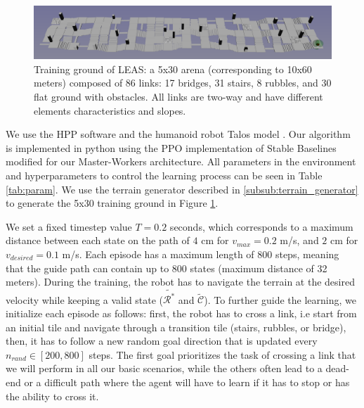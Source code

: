\begin{figure}
    \centering
    \includegraphics[width=\textwidth]{Figures/Chapter_LEAS/arena_5x30.png}
    \caption{Training ground of LEAS: a 5x30 arena (corresponding to 10x60 meters) composed of 86 links: 17 bridges, 31 stairs, 8 rubbles, and 30 flat ground with obstacles. All links are two-way and have different elements characteristics and slopes.}
    \label{fig:arena_5x30}
\end{figure}

We use the HPP software \cite{HPP} and the humanoid robot Talos model \cite{talos_robot}. Our algorithm is implemented in python using the PPO implementation of Stable Baselines \cite{stable-baselines} modified for our Master-Workers architecture.
All parameters in the environment and hyperparameters to control the learning process can be seen in Table \ref{tab:param}. We use the terrain generator described in \ref{subsub:terrain_generator} to generate the 5x30 training ground in Figure \ref{fig:arena_5x30}.

We set a fixed timestep value $T =0.2$ seconds, which corresponds to a maximum distance between each state on the path of $4$ cm for $v_{max}=0.2$ m/s, and $2$ cm for $v_{desired}=0.1$ m/s.
Each episode has a maximum length of $800$ steps, meaning that the guide path can contain up to $800$ states (maximum distance of 32 meters). 
During the training, the robot has to navigate the terrain at the desired velocity while keeping a valid state ($\tilde{\mathcal{R}^*}$ and $\tilde{\mathcal{C}}$).
To further guide the learning, we initialize each episode as follows: first, the robot has to cross a link, i.e start from an initial tile and navigate through a transition tile (stairs, rubbles, or bridge), then, it has to follow a new random goal direction that is updated every $n_{rand} \in [200,800]$ steps.
The first goal prioritizes the task of crossing a link that we will perform in all our basic scenarios, while the others often lead to a dead-end or a difficult path where the agent will have to learn if it has to stop or has the ability to cross it.

